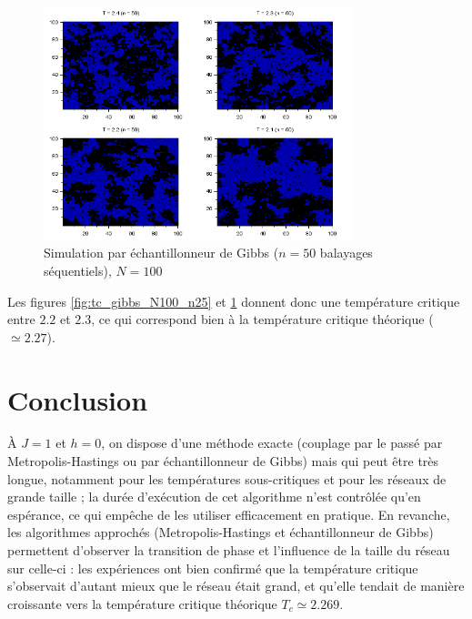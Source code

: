 \documentclass[a4paper,11pt]{article}
\begin{document}
\begin{figure}[!htbp]
	\label{fig:tc_gibbs_N100_n50}
	\includegraphics[width=0.8\textwidth]{temperature_critique_gibbs_N100_n50.png}
	\caption{Simulation par échantillonneur de Gibbs ($n = 50$ balayages séquentiels), $N = 100$}
\end{figure}
Les figures \ref{fig:tc_gibbs_N100_n25} et \ref{fig:tc_gibbs_N100_n50} donnent donc une température critique entre $2.2$ et $2.3$, ce qui correspond bien à la température critique théorique ($\simeq 2.27$).

\section{Conclusion}

À $J = 1$ et $h = 0$, on dispose d'une méthode exacte (couplage par le passé par Metropolis-Hastings ou par échantillonneur de Gibbs) mais qui peut être très longue, notamment pour les températures sous-critiques et pour les réseaux de grande taille ; la durée d'exécution de cet algorithme n'est contrôlée qu'en espérance, ce qui empêche de les utiliser efficacement en pratique. En revanche, les algorithmes approchés (Metropolis-Hastings et échantillonneur de Gibbs) permettent d'observer la transition de phase et l'influence de la taille du réseau sur celle-ci : les expériences ont bien confirmé que la température critique s'observait d'autant mieux que le réseau était grand, et qu'elle tendait de manière croissante vers la température critique théorique $T_c \simeq 2.269$.





\nocite{*}


\end{document}
